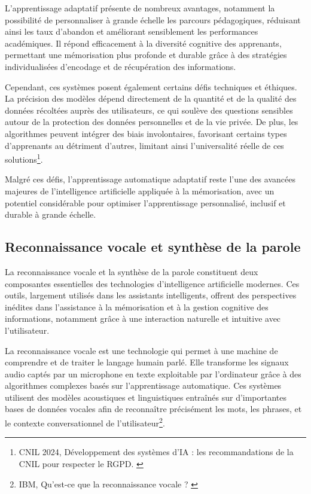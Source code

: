 \documentclass[11pt,a4paper]{report}
\begin{document}
L’apprentissage adaptatif présente de nombreux avantages, notamment la possibilité de personnaliser à grande échelle les parcours pédagogiques, réduisant ainsi les taux d’abandon et améliorant sensiblement les performances académiques. Il répond efficacement à la diversité cognitive des apprenants, permettant une mémorisation plus profonde et durable grâce à des stratégies individualisées d'encodage et de récupération des informations.

Cependant, ces systèmes posent également certains défis techniques et éthiques. La précision des modèles dépend directement de la quantité et de la qualité des données récoltées auprès des utilisateurs, ce qui soulève des questions sensibles autour de la protection des données personnelles et de la vie privée. De plus, les algorithmes peuvent intégrer des biais involontaires, favorisant certains types d'apprenants au détriment d’autres, limitant ainsi l'universalité réelle de ces solutions\footnote{CNIL 2024, Développement des systèmes d’IA : les recommandations de la CNIL pour respecter le RGPD. \cite{cnil}}.

Malgré ces défis, l’apprentissage automatique adaptatif reste l'une des avancées majeures de l’intelligence artificielle appliquée à la mémorisation, avec un potentiel considérable pour optimiser l’apprentissage personnalisé, inclusif et durable à grande échelle.

\subsection{Reconnaissance vocale et synthèse de la parole}

La reconnaissance vocale et la synthèse de la parole constituent deux composantes essentielles des technologies d’intelligence artificielle modernes. Ces outils, largement utilisés dans les assistants intelligents, offrent des perspectives inédites dans l’assistance à la mémorisation et à la gestion cognitive des informations, notamment grâce à une interaction naturelle et intuitive avec l’utilisateur.

La reconnaissance vocale est une technologie qui permet à une machine de comprendre et de traiter le langage humain parlé. Elle transforme les signaux audio captés par un microphone en texte exploitable par l’ordinateur grâce à des algorithmes complexes basés sur l’apprentissage automatique. Ces systèmes utilisent des modèles acoustiques et linguistiques entraînés sur d’importantes bases de données vocales afin de reconnaître précisément les mots, les phrases, et le contexte conversationnel de l’utilisateur\footnote{IBM, Qu’est-ce que la reconnaissance vocale ? \cite{ibm}}.
\end{document}
